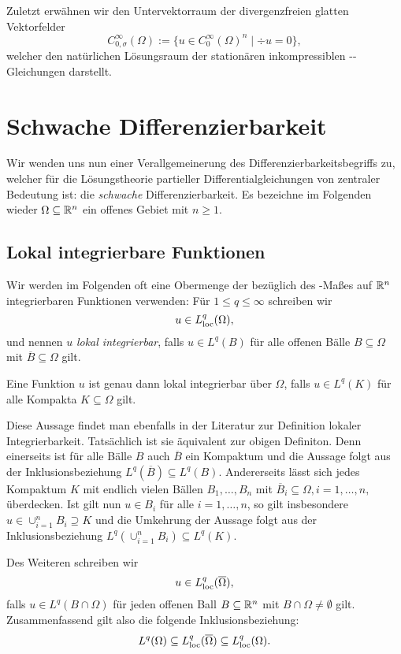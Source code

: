 Zuletzt erwähnen wir den Untervektorraum der divergenzfreien glatten Vektorfelder
$$
C_{0,\sigma}^\infty(\Omega) := \{u \in C_0^\infty(\Omega)^n \mid \div u = 0\},
$$
 welcher den natürlichen Lösungsraum der stationären inkompressiblen \navier\hyp{}\stokes\hyp{}Gleichungen darstellt.

\section{Schwache Differenzierbarkeit}
\label{subsec:distributionsSobolev}

Wir wenden uns nun einer Verallgemeinerung des Differenzierbarkeitsbegriffs zu, welcher für die Lösungstheorie partieller Differentialgleichungen von zentraler Bedeutung ist: die \emph{schwache} Differenzierbarkeit.
Es bezeichne im Folgenden wieder $\Omega \subseteq \mathbb{R}^n$ ein offenes Gebiet mit $n \geq 1$.

\subsection{Lokal integrierbare Funktionen}

Wir werden im Folgenden oft eine Obermenge der bezüglich des \lebesgue\hyp{}Maßes auf $\mathbb{R}^n$ integrierbaren Funktionen verwenden:
Für $1 \leq q \leq \infty$ schreiben wir
$$
  u \in L^q_{\operatorname{loc}}(\Omega),
$$
und nennen $u$ \emph{lokal integrierbar}, falls $u \in L^q(B)$ für alle offenen Bälle $B \subseteq \Omega$ mit $\overline B \subseteq \Omega$ gilt.

\begin{bem}
  Eine Funktion $u$ ist genau dann lokal integrierbar über $\Omega$, falls $u \in L^q(K)$ für alle Kompakta $K \subseteq \Omega$ gilt.

  Diese Aussage findet man ebenfalls in der Literatur zur Definition lokaler Integrierbarkeit.
  Tatsächlich ist sie äquivalent zur obigen Definiton.
  Denn einerseits ist für alle Bälle $B$ auch $\overline B$ ein Kompaktum und die Aussage folgt aus der Inklusionsbeziehung $L^q(\overline B) \subseteq L^q(B)$.
  Andererseits lässt sich jedes Kompaktum $K$ mit endlich vielen Bällen $B_1, \dots, B_n$ mit $\overline B_i \subseteq \Omega, i =1,\dots,n,$ überdecken. 
  Ist gilt nun $u \in B_i$ für alle $i = 1, \dots, n$, so gilt insbesondere $u \in \cup_{i = 1}^n B_i \supseteq K$ und die Umkehrung der Aussage folgt aus der Inklusionsbeziehung $L^q(\cup_{i = 1}^n B_i) \subseteq L^q(K)$.
\end{bem}

Des Weiteren schreiben wir
$$
u \in L^q_{\operatorname{loc}}(\overline\Omega),
$$
falls $u \in L^q(B \cap \Omega)$ für jeden offenen Ball $B \subseteq \mathbb{R}^n$ mit $B \cap \Omega \neq \emptyset$ gilt.
Zusammenfassend gilt also die folgende Inklusionsbeziehung:
$$
L^q(\Omega) \subseteq L^q_{\operatorname{loc}}(\overline\Omega) \subseteq L^q_{\operatorname{loc}}(\Omega).
$$

